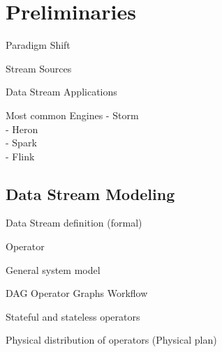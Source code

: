 \chapter{Preliminaries
  \label{chapter:preliminaries}}

  Paradigm Shift\cite{chakravarthy2009stream}

  Stream Sources  \cite{kamburugamuve2013survey}

  Data Stream Applications\cite{chakravarthy2009stream}

  Most common Engines  \cite{kamburugamuve2013survey}
  - Storm  \cite{kamburugamuve2013survey} \cite{R_ger_2019}\\
  - Heron \cite{R_ger_2019}\\
  - Spark \cite{R_ger_2019}\\
  - Flink \cite{R_ger_2019}

  \section{Data Stream Modeling}
  Data Stream definition (formal) \cite{KottoKombi2015ParallelAD} \cite{kamburugamuve2013survey}\cite{R_ger_2019}

  Operator  \cite{kamburugamuve2013survey}

  General system model

  DAG  \cite{kamburugamuve2013survey}
  Operator Graphs \cite{R_ger_2019}
  Workflow  \cite{KottoKombi2015ParallelAD}

  Stateful and stateless operators  \cite{KottoKombi2015ParallelAD}

  Physical distribution of operators (Physical plan)  \cite{kamburugamuve2013survey}

